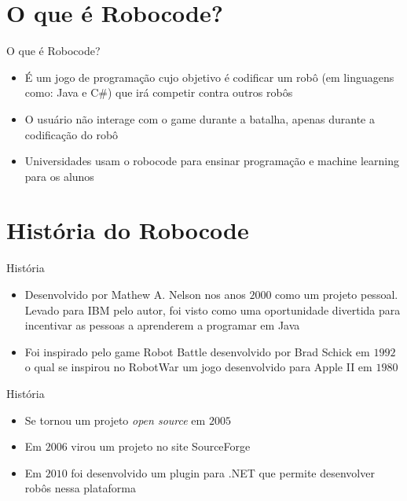 \section{O que é Robocode?}

\begin{frame}
	\begin{block}{O que é Robocode?}
		\begin{itemize}
			\item É um jogo de programação cujo objetivo é codificar um robô (em linguagens como: Java e C\#) que irá competir contra outros robôs

			\item O usuário não interage com o game durante a batalha, apenas durante a codificação do robô
			
			\item Universidades usam o robocode para ensinar programação e machine learning para os alunos \citep{ROBOWIKI}
			
		\end{itemize}
	\end{block}
\end{frame}


\section{História do Robocode}

\begin{frame}
	\begin{block}{História}
		\begin{itemize}
			\item Desenvolvido por Mathew A. Nelson nos anos $2000$ como um projeto pessoal. Levado para IBM pelo autor, foi visto como uma oportunidade divertida para incentivar as pessoas a aprenderem a programar em Java

			\item Foi inspirado pelo game Robot Battle desenvolvido por Brad Schick em $1992$ o qual se inspirou no RobotWar um jogo desenvolvido para Apple II em $1980$
			
		\end{itemize}
	\end{block}
\end{frame}


\begin{frame}
	\begin{block}{História}
		\begin{itemize}
		
			\item Se tornou um projeto \emph{open source} em $2005$
			
			\item Em $2006$ virou um projeto no site SourceForge

			\item Em $2010$ foi desenvolvido um plugin para .NET que permite desenvolver robôs nessa plataforma \citep{readmeRobo}
						
		\end{itemize}
	\end{block}
\end{frame}



